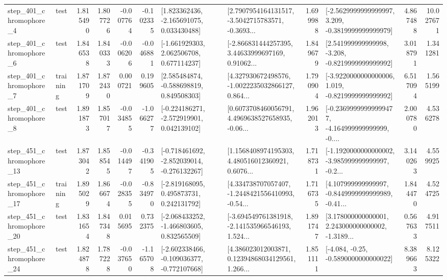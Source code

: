 \begin{tabular}{llrrrrllrlrr}
   step\_401\_chromophore\_4 &      test &      1.815490 &    1.807726 &     -0.007764 & -0.102335 &    [1.823362436, -2.165691075, 0.033430488] &  [2.7907954164131517, -3.5042715783571, -0.3693... &       1.699988 &  [-2.5629999999999997, 3.209, -0.3819999999999979] &            4.867488 &         10.027671 \\
   step\_401\_chromophore\_6 &      test &      1.846538 &    1.840333 &     -0.006206 & -0.046881 &    [-1.661929303, 2.062506708, 0.677114237] &  [-2.866831444257395, 3.44633999697169, 0.91062... &       1.849679 &   [2.541999999999998, -3.208, -0.8219999999999992] &            3.018791 &          1.341281 \\
   step\_401\_chromophore\_7 &  training &      1.871709 &    1.872430 &      0.000721 &  0.199605 &    [2.585484874, -0.588698819, 0.849508303] &  [4.327930672498576, -1.0022235032866127, 0.864... &       1.790904 &  [-3.9220000000000006, 1.019, -0.8219999999999992] &            6.517094 &          1.565199 \\
   step\_401\_chromophore\_8 &      test &      1.891873 &    1.857017 &     -0.034855 & -1.066277 &   [-0.224186271, -2.572919901, 0.042139102] &  [0.6073708460056791, 4.4969638527658935, -0.06... &       1.962013 &  [-0.23699999999999477, -4.164999999999999, -0.... &            2.000780 &          4.536278 \\
  step\_451\_chromophore\_13 &      test &      1.873042 &    1.858545 &     -0.014497 & -0.341905 &  [-0.718461692, -2.852039014, -0.276132267] &  [1.1568408974195303, 4.480516012360921, 0.6076... &       1.718731 &  [-1.1920000000000002, -3.985999999999997, -0.2... &            3.140263 &          4.559925 \\
  step\_451\_chromophore\_17 &  training &      1.895029 &    1.866674 &     -0.028355 & -0.834970 &    [-2.819168095, 0.495873731, 0.242131792] &  [4.334738707057407, -1.2448421556410993, -0.54... &       1.716735 &  [4.107999999999997, -0.8449999999999989, -0.41... &            1.844470 &          4.524725 \\
  step\_451\_chromophore\_20 &      test &      1.831654 &    1.847348 &      0.015695 &  0.732375 &   [-2.068433252, -1.466803605, 0.832565509] &  [-3.694549761381918, -2.141535966546193, 1.524... &       1.891747 &  [3.178000000000001, 2.243000000000002, -1.3189... &            0.567633 &          4.917511 \\
  step\_451\_chromophore\_24 &      test &      1.824878 &    1.787228 &     -0.037650 & -1.165708 &  [-2.602338466, -0.109036377, -0.772107668] &  [4.386023012003871, 0.12394868034129561, 1.266... &       1.851111 &               [-4.084, -0.25, -0.5890000000000022] &            8.389663 &          8.125322 \\

\end{tabular}
